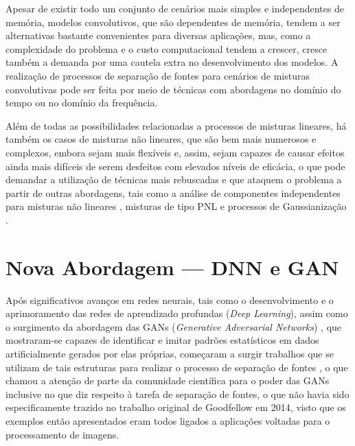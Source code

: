
Apesar de existir todo um conjunto de cenários mais simples e independentes de memória, modelos convolutivos, que são dependentes de memória, tendem a ser alternativas bastante convenientes para diversas aplicações, mas, como a complexidade do problema e o custo computacional tendem a crescer, cresce também a demanda por uma cautela extra no desenvolvimento dos modelos. A realização de processos de separação de fontes para cenários de misturas convolutivas pode ser feita por meio de técnicas com abordagens no domínio do tempo ou no domínio da frequência.





Além de todas as possibilidades relacionadas a processos de misturas lineares, há também os casos de misturas não lineares, que são bem mais numerosos e complexos, embora sejam mais flexíveis e, assim, sejam capazes de causar efeitos ainda mais difíceis de serem desfeitos com elevados níveis de eficácia, o que pode demandar a utilização de técnicas mais rebuscadas e que ataquem o problema a partir de outras abordagens, tais como a análise de componentes independentes para misturas não lineares \citep{hyvarinen1999nonlinear}, misturas de tipo PNL \citep{taleb1999source} e processos de Gaussianização \citep{sole2003improving, ziehe2003blind}.



\section{Nova Abordagem --- DNN e GAN}
\label{sec:intro_new_approach}

Após significativos avanços em redes neurais, tais como o desenvolvimento e o aprimoramento das redes de aprendizado profundas (\textit{Deep Learning}), assim como o surgimento da abordagem das GANs (\textit{Generative Adversarial Networks}) \citep{NIPS2014_5423}, que mostraram-se capazes de identificar e imitar padrões estatísticos em dados artificialmente gerados por elas próprias, começaram a surgir trabalhos que se utilizam de tais estruturas para realizar o processo de separação de fontes \citep{8461671, kaneko2018generative, fan2018svsgan}, o que chamou a atenção de parte da comunidade científica para o poder das GANs inclusive no que diz respeito à tarefa de separação de fontes, o que não havia sido especificamente trazido no trabalho original de Goodfellow em 2014, visto que os exemplos então apresentados eram todos ligados a aplicações voltadas para o processamento de imagens.

